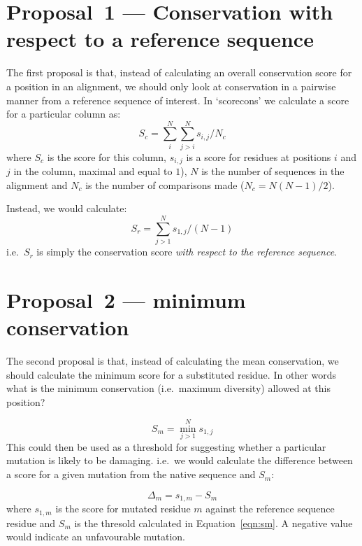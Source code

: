 \documentclass[a4paper]{article}
\begin{document}
\section{Proposal~1 --- Conservation with respect to a reference
  sequence} 
The first proposal is that, instead of calculating an overall
conservation score for a position in an alignment, we should only
look at conservation in a pairwise manner from a reference sequence of
interest. In `scorecons' we calculate a score for a particular column as:
\begin{equation}\label{eqn:sc}
  S_c = \sum_{i}^N\sum_{j>i}^Ns_{i, j} / N_c
\end{equation}
where $S_c$ is the score for this column, $s_{i,j}$ is a score for
residues at positions $i$ and $j$ in the column, maximal and
equal to $1$), $N$ is the number of sequences in the alignment and
$N_c$ is the number of comparisons made ($N_c = N(N-1)/2$).

Instead, we would calculate:
\begin{equation}\label{eqn:sr}
  S_{r} = \sum_{j>1}^Ns_{1, j} / (N-1)
\end{equation}
i.e.\ $S_r$ is simply the conservation score \emph{with respect to
  the reference sequence}.

\section{Proposal~2 --- minimum conservation}
The second proposal is that, instead of calculating the mean
conservation, we should calculate the minimum score for a substituted
residue. In other words what is the minimum conservation (i.e.\
maximum diversity) allowed at this position?

\begin{equation} \label{eqn:sm}
  S_{m} = \min_{j>1}^Ns_{1, j}
\end{equation}
This could then be used as a threshold for suggesting whether a
particular mutation is likely to be damaging. i.e.\ we would calculate
the difference between a score for a given mutation from the native
sequence and $S_m$:

\begin{equation}
  \Delta_m = s_{1, m} - S_m
\end{equation}
where $s_{1,m}$ is the score for mutated residue $m$ against the
reference sequence residue and $S_m$ is the thresold calculated in
Equation~\ref{eqn:sm}. A negative value would indicate an unfavourable
mutation. 
\end{document}
